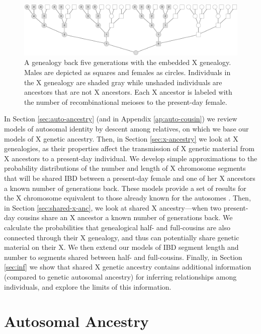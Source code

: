 \documentclass[9pt,twocolumn,twoside]{gsajnl}
\begin{document}
\begin{figure}[!ht]
  \centering
  \includegraphics[width=\textwidth]{images/x-rm-tree.eps}

  \caption{A genealogy back five generations with the embedded X genealogy.
    Males are depicted as squares and females as circles.  Individuals in the X
    genealogy are shaded gray while unshaded individuals are ancestors that are
    not X ancestors. Each X ancestor is labeled with the number of
  recombinational meioses to the present-day female.}
  \label{fig:x-rm-tree}
\end{figure}

In Section \ref{sec:auto-ancestry} (and in Appendix \ref{ap:auto-cousin}) we
review models of autosomal identity by descent among relatives, on which we
base our models of X genetic ancestry.  Then, in Section \ref{sec:x-ancestry}
we look at X genealogies, as their properties affect the transmission of X
genetic material from X ancestors to a present-day individual. We develop
simple approximations to the probability distributions of the number and length
of X chromosome segments that will be shared IBD between a present-day female
and one of her X ancestors a known number of generations back. These models
provide a set of results for the X chromosome equivalent to those already known
for the autosomes \citep{Donnelly:1983fi,thomas:1994hg}. Then, in Section
\ref{sec:shared-x-anc}, we look at shared X ancestry---when two present-day
cousins share an X ancestor a known number of generations back. We calculate
the probabilities that genealogical half- and full-cousins are also connected
through their X genealogy, and thus can potentially share genetic material on
their X. We then extend our models of IBD segment length and number to segments
shared between half- and full-cousins. Finally, in Section \ref{sec:inf} we
show that shared X genetic ancestry contains additional information (compared
to genetic autosomal ancestry) for inferring relationships among individuals,
and explore the limits of this information. 

\section*{Autosomal Ancestry}
\label{sec:auto-ancestry}
\end{document}
